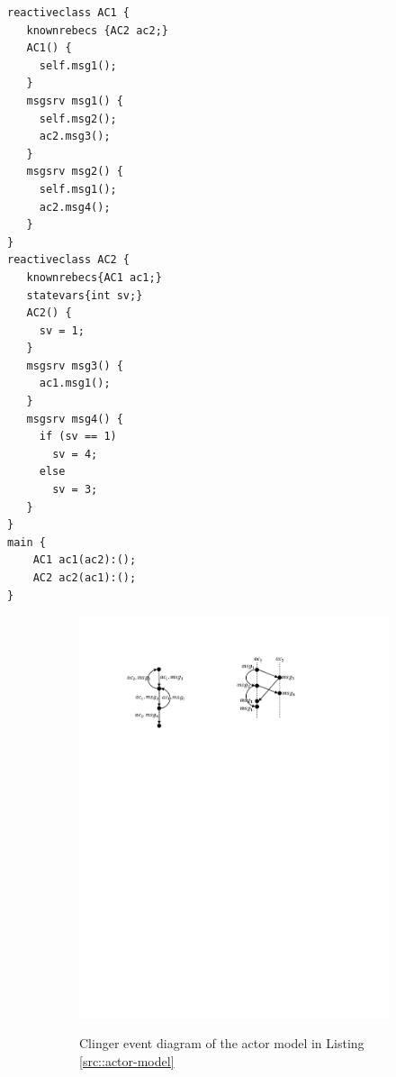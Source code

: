 \begin{lstlisting}[language=rebeca, caption= A simple actor model, label=src::actor-model]
reactiveclass AC1 {
   knownrebecs {AC2 ac2;}
   AC1() {
     self.msg1();
   }
   msgsrv msg1() {
     self.msg2();
     ac2.msg3();
   }
   msgsrv msg2() {
     self.msg1();
     ac2.msg4();
   }
}
reactiveclass AC2 {
   knownrebecs{AC1 ac1;}
   statevars{int sv;}
   AC2() {
     sv = 1;
   }
   msgsrv msg3() {
     ac1.msg1();
   }
   msgsrv msg4() {
     if (sv == 1)
       sv = 4;
     else
       sv = 3;
   }
}
main {
    AC1 ac1(ac2):();
    AC2 ac2(ac1):();
}
\end{lstlisting}

\begin{figure}
\centering
\begin{subfigure}[b]{0.2\textwidth}
  \centering
  \small{
   \includegraphics[width=.8\textwidth]{resources/clinger.pdf}
  }
  \caption{Clinger event diagram of the actor model in Listing \ref{src::actor-model}}
  \label{fig::clinger}
\end{subfigure}
\qquad
\begin{subfigure}[b]{0.2\textwidth}


\end{subfigure}
\end{figure}
